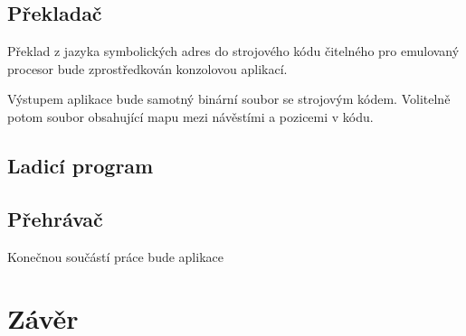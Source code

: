 \subsection{Překladač}

Překlad z jazyka symbolických adres do strojového kódu čitelného pro emulovaný procesor bude zprostředkován konzolovou aplikací.

Výstupem aplikace bude samotný binární soubor se strojovým kódem. Volitelně potom soubor obsahující mapu mezi návěstími a pozicemi v kódu.

\blind[1]

\subsection{Ladicí program}

\blind[2]

\subsection{Přehrávač}

Konečnou součástí práce bude aplikace

\section{Závěr}

\blind[1]